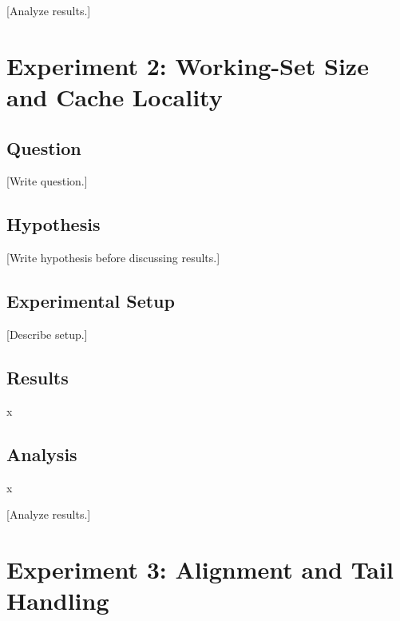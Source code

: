 \documentclass[11pt]{article}
\begin{document}
%

[Analyze results.]

\section{Experiment 2: Working-Set Size and Cache Locality}

\subsection{Question}
[Write question.]

\subsection{Hypothesis}
[Write hypothesis before discussing results.]

\subsection{Experimental Setup}


[Describe setup.]

\subsection{Results}
x

\subsection{Analysis}
x

[Analyze results.]

\section{Experiment 3: Alignment and Tail Handling}
\end{document}
